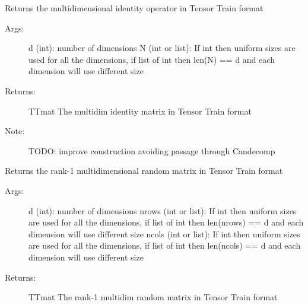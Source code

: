 \documentclass[a4paper,10pt,english]{sphinxmanual}
\begin{document}
\begin{fulllineitems}
\label{api-core:TensorToolbox.core.eye}
Returns the multidimensional identity operator in Tensor Train format
\begin{description}
\item[{Args:}] \leavevmode
d (int): number of dimensions
N (int or list): If int then uniform sizes are used for all the dimensions, if list of int then len(N) == d and each dimension will use different size

\item[{Returns:}] \leavevmode
TTmat The multidim identity matrix in Tensor Train format

\item[{Note:}] \leavevmode
TODO: improve construction avoiding passage through Candecomp

\end{description}

\end{fulllineitems}


\begin{fulllineitems}
\label{api-core:TensorToolbox.core.randmat}
Returns the rank-1 multidimensional random matrix in Tensor Train format
\begin{description}
\item[{Args:}] \leavevmode
d (int): number of dimensions
nrows (int or list): If int then uniform sizes are used for all the dimensions, if list of int then len(nrows) == d and each dimension will use different size
ncols (int or list): If int then uniform sizes are used for all the dimensions, if list of int then len(ncols) == d and each dimension will use different size

\item[{Returns:}] \leavevmode
TTmat The rank-1 multidim random matrix in Tensor Train format

\end{description}

\end{fulllineitems}

\end{document}
